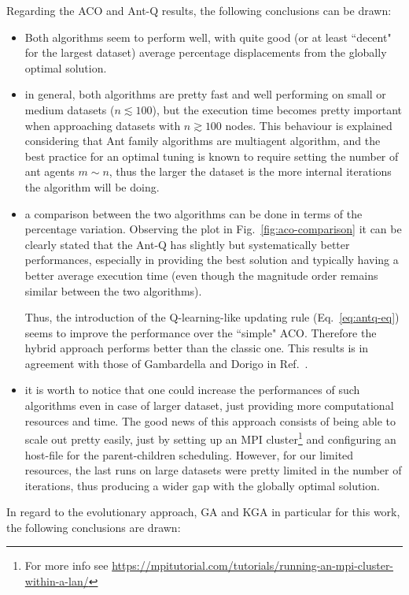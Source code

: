 \documentclass[10pt]{article}
\begin{document}
Regarding the ACO and Ant-Q results, the following conclusions can be drawn:
\begin{itemize}
\item Both algorithms seem to perform well, with quite good (or at least ``decent" for the largest dataset) average percentage displacements from the globally optimal solution.

\item in general, both algorithms are pretty fast and well performing on small or medium datasets ($n \lesssim 100$), but the execution time becomes pretty important when approaching datasets with $n \gtrsim 100$ nodes. This behaviour is explained considering that Ant family algorithms are multiagent algorithm, and the best practice for an optimal tuning is known to require setting the number of ant agents $m \sim n$, thus the larger the dataset is the more internal iterations the algorithm will be doing.

\item a comparison between the two algorithms can be done in terms of the percentage variation. Observing the plot in Fig.~\ref{fig:aco-comparison} it can be clearly stated that the Ant-Q has slightly but systematically better performances, especially in providing the best solution and typically having a better average execution time (even though the magnitude order remains similar between the two algorithms).

Thus, the introduction of the Q-learning-like updating rule (Eq.~\ref{eq:antq-eq}) seems to improve the performance over the ``simple" ACO. Therefore the hybrid approach performs better than the classic one. 
This results is in agreement with those of Gambardella and Dorigo in Ref.~\cite{undici}.

\item it is worth to notice that one could increase the performances of such algorithms even in case of larger dataset, just providing more computational resources and time. The good news of this approach consists of being able to scale out pretty easily, just by setting up an MPI cluster\footnote{For more info see \url{https://mpitutorial.com/tutorials/running-an-mpi-cluster-within-a-lan/}} and configuring an host-file for the parent-children scheduling.
However, for our limited resources, the last runs on large datasets were pretty limited in the number of iterations, thus producing a wider gap with the globally optimal solution.
\end{itemize}
In regard to  the evolutionary approach, GA and KGA in particular for this work, the following conclusions are drawn:
\end{document}
